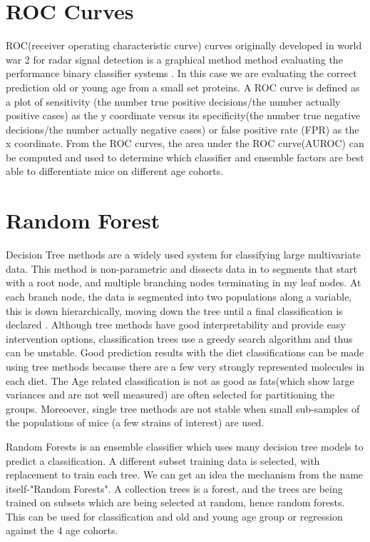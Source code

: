 \documentclass[a4paper]{book}
\begin{document}
	\section{ROC Curves}
	
	ROC(receiver operating characteristic curve) curves originally developed in world war 2 for radar signal detection is a graphical method method evaluating the performance binary classifier systems \citep{HajianTilaki2013}. In this case we are evaluating the correct prediction old or young age from a small set proteins. A ROC curve is defined as a plot of sensitivity (the number true positive decisions/the number actually positive cases) as the y coordinate versus its specificity(the number true negative decisions/the number actually negative cases) or false positive rate (FPR) as the x coordinate. From the ROC curves, the area under the ROC curve(AUROC) can be computed and used to determine which classifier and ensemble factors are best able to differentiate mice on different age cohorts.
	
	\section{Random Forest}
	
	Decision Tree methods are a widely used system for classifying large multivariate data. This method is non-parametric and dissects data in to segments that start with a root node, and multiple branching nodes terminating in my leaf nodes. At each branch node, the data is segmented into two populations along a variable, this is down hierarchically, moving down the tree until a final classification is declared \citep{Song2015DecisionTrees}. Although tree methods have good interpretability and provide easy intervention options, classification trees use a greedy search algorithm and thus can be unstable\citep{Song2015DecisionTrees}. Good prediction results with the diet classifications can be made using tree methods because there are a few very strongly represented molecules in each diet. The Age related classification is not as good as fats(which show large variances and are not well measured) are often selected for partitioning the groups. Moreoever, single tree methods are not stable when small sub-samples of the populations of mice (a few strains of interest) are used.
	
	Random Forests is an ensemble classifier which uses many decision tree models to predict a classification. A different subset training data is selected, with replacement to train each tree\citep{Goel2017RandomForest}. We can get an idea the mechanism from the name itself-"Random Forests". A collection trees is a forest, and the trees are being trained on subsets which are being selected at random, hence random forests\citep{Goel2017RandomForest}. This can be used for classification and old and young age group or regression against the 4 age cohorts.
	
\end{document}
